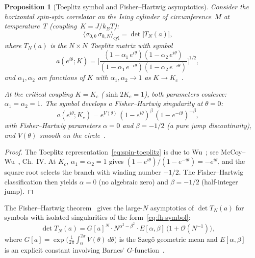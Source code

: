 \documentclass[11pt]{article}
\newtheorem{proposition}[theorem]{Proposition}
\theoremstyle{definition}
\theoremstyle{remark}
\newcommand{\cO}{\mathcal{O}}
\begin{document}
\begin{proposition}[Toeplitz symbol and Fisher--Hartwig asymptotics]
\label{prop:toeplitz-fh}
Consider the horizontal spin-spin correlator on the Ising cylinder
of circumference~$M$ at temperature~$T$ (coupling~$K = J/k_BT$):
\begin{equation}
  \langle\sigma_{0,0}\,\sigma_{0,N}\rangle_{\mathrm{cyl}}
    = \det\bigl[T_N(a)\bigr],
  \label{eq:spin-toeplitz}
\end{equation}
where $T_N(a)$ is the $N \times N$ Toeplitz matrix with symbol
\begin{equation}
  a(e^{i\theta}; K) = \biggl[
    \frac{(1 - \alpha_1\, e^{i\theta})(1 - \alpha_2\, e^{i\theta})}
         {(1 - \alpha_1\, e^{-i\theta})(1 - \alpha_2\, e^{-i\theta})}
  \biggr]^{1/2},
  \label{eq:wu-symbol}
\end{equation}
and $\alpha_1, \alpha_2$ are functions of $K$ with
$\alpha_1, \alpha_2 \to 1$ as $K \to K_c$~\cite{McCoyWu1973,Wu1966}.

At the critical coupling $K = K_c$ ($\sinh 2K_c = 1$), both parameters
coalesce: $\alpha_1 = \alpha_2 = 1$.
The symbol develops a Fisher--Hartwig singularity at $\theta = 0$:
\begin{equation}
  a(e^{i\theta}; K_c) = e^{V(\theta)}\,
    (1 - e^{i\theta})^{\beta}\,(1 - e^{-i\theta})^{-\beta},
  \label{eq:fh-symbol}
\end{equation}
with Fisher--Hartwig parameters $\alpha = 0$ and $\beta = -1/2$
(a pure jump discontinuity), and $V(\theta)$ smooth on the
circle~\cite{FisherHartwig1968,Deift2011}.
\end{proposition}

\begin{proof}
The Toeplitz representation~\eqref{eq:spin-toeplitz} is due to
Wu~\cite{Wu1966}; see McCoy--Wu~\cite{McCoyWu1973}, Ch.~IV.
At $K_c$, $\alpha_1 = \alpha_2 = 1$ gives
$(1-e^{i\theta})/(1-e^{-i\theta}) = -e^{i\theta}$, and the
square root selects the branch with winding number $-1/2$.
The Fisher--Hartwig classification then yields $\alpha = 0$
(no algebraic zero) and $\beta = -1/2$ (half-integer jump).
\end{proof}

The Fisher--Hartwig theorem~\cite{FisherHartwig1968,BasorWidom1983,
Deift2011} gives the large-$N$ asymptotics of $\det T_N(a)$ for
symbols with isolated singularities of the
form~\eqref{eq:fh-symbol}:
\begin{equation}
  \det T_N(a) = G[a]^N \cdot N^{\alpha^2 - \beta^2}\cdot
    E[\alpha,\beta]\,\bigl(1 + \cO(N^{-1})\bigr),
  \label{eq:fh-asymptotics}
\end{equation}
where $G[a] = \exp\bigl(\frac{1}{2\pi}\int_0^{2\pi}
V(\theta)\,d\theta\bigr)$ is the Szeg\H{o} geometric mean and
$E[\alpha,\beta]$ is an explicit constant involving Barnes'
$G$-function~\cite{Deift2011}.
\end{document}
